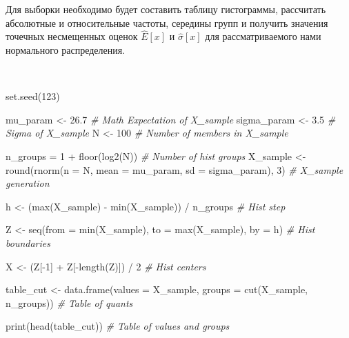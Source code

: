 \documentclass[
  14,
]{article}
\newenvironment{Shaded}{\begin{snugshade}}{\end{snugshade}}
\newcommand{\AttributeTok}[1]{\textcolor[rgb]{0.77,0.63,0.00}{#1}}
\newcommand{\CommentTok}[1]{\textcolor[rgb]{0.56,0.35,0.01}{\textit{#1}}}
\newcommand{\DecValTok}[1]{\textcolor[rgb]{0.00,0.00,0.81}{#1}}
\newcommand{\FloatTok}[1]{\textcolor[rgb]{0.00,0.00,0.81}{#1}}
\newcommand{\FunctionTok}[1]{\textcolor[rgb]{0.00,0.00,0.00}{#1}}
\newcommand{\NormalTok}[1]{#1}
\newcommand{\OtherTok}[1]{\textcolor[rgb]{0.56,0.35,0.01}{#1}}
\newcommand{\SpecialCharTok}[1]{\textcolor[rgb]{0.00,0.00,0.00}{#1}}
\begin{document}
Для выборки необходимо будет составить таблицу гистограммы, рассчитать
абсолютные и относительные частоты, середины групп и получить значения
точечных несмещенных оценок \(\hat{E}[x]\) и \(\hat{\sigma}[x]\) для
рассматриваемого нами нормального распределения.

\(\ \)

\begin{Shaded}
\begin{Highlighting}[]
\FunctionTok{set.seed}\NormalTok{(}\DecValTok{123}\NormalTok{)}

\NormalTok{mu\_param }\OtherTok{\textless{}{-}} \FloatTok{26.7}                         \CommentTok{\# Math Expectation of X\_sample}
\NormalTok{sigma\_param }\OtherTok{\textless{}{-}} \FloatTok{3.5}                       \CommentTok{\# Sigma of X\_sample}
\NormalTok{N }\OtherTok{\textless{}{-}} \DecValTok{100}                                 \CommentTok{\# Number of members in X\_sample}

\NormalTok{n\_groups }\OtherTok{=} \DecValTok{1} \SpecialCharTok{+} \FunctionTok{floor}\NormalTok{(}\FunctionTok{log2}\NormalTok{(N))                       }\CommentTok{\# Number of hist groups}
\NormalTok{X\_sample }\OtherTok{\textless{}{-}} \FunctionTok{round}\NormalTok{(}\FunctionTok{rnorm}\NormalTok{(}\AttributeTok{n =}\NormalTok{ N, }
                        \AttributeTok{mean =}\NormalTok{ mu\_param, }
                        \AttributeTok{sd =}\NormalTok{ sigma\_param), }\DecValTok{3}\NormalTok{)       }\CommentTok{\# X\_sample generation}


\NormalTok{h }\OtherTok{\textless{}{-}}\NormalTok{ (}\FunctionTok{max}\NormalTok{(X\_sample) }\SpecialCharTok{{-}} \FunctionTok{min}\NormalTok{(X\_sample)) }\SpecialCharTok{/}\NormalTok{ n\_groups     }\CommentTok{\# Hist step}

\NormalTok{Z }\OtherTok{\textless{}{-}} \FunctionTok{seq}\NormalTok{(}\AttributeTok{from =} \FunctionTok{min}\NormalTok{(X\_sample),}
         \AttributeTok{to =} \FunctionTok{max}\NormalTok{(X\_sample),}
         \AttributeTok{by =}\NormalTok{ h)                                    }\CommentTok{\# Hist boundaries}

\NormalTok{X }\OtherTok{\textless{}{-}}\NormalTok{ (Z[}\SpecialCharTok{{-}}\DecValTok{1}\NormalTok{] }\SpecialCharTok{+}\NormalTok{ Z[}\SpecialCharTok{{-}}\FunctionTok{length}\NormalTok{(Z)]) }\SpecialCharTok{/} \DecValTok{2}                    \CommentTok{\# Hist centers}

\NormalTok{table\_cut }\OtherTok{\textless{}{-}} \FunctionTok{data.frame}\NormalTok{(}\AttributeTok{values =}\NormalTok{ X\_sample, }
                        \AttributeTok{groups =} \FunctionTok{cut}\NormalTok{(X\_sample, n\_groups)) }\CommentTok{\# Table of quants}

\FunctionTok{print}\NormalTok{(}\FunctionTok{head}\NormalTok{(table\_cut))                              }\CommentTok{\# Table of values and groups}
\end{Highlighting}
\end{Shaded}
\end{document}
